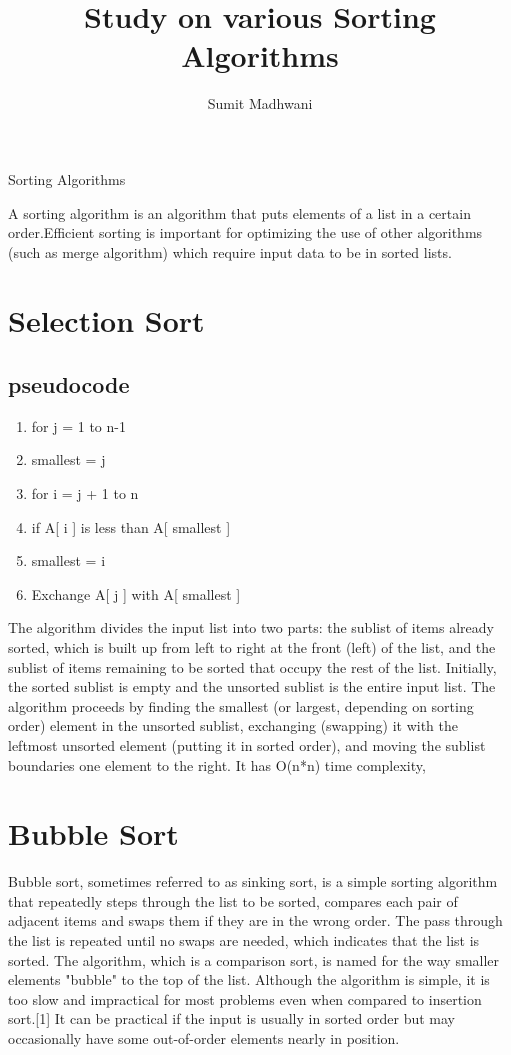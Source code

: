 \documentclass{IEEEtran}
\author{Sumit Madhwani}
\title{Study on various Sorting Algorithms}
\begin{document}
\maketitle


\begin{center}
Sorting Algorithms
\end{center}
A sorting algorithm is an algorithm that puts elements of a list in a certain order.Efficient sorting is important for optimizing the use of other algorithms (such as merge algorithm) which require input data to be in sorted lists.
\section{Selection Sort}
\subsection{pseudocode}
\begin{enumerate}
\item	    for j = 1 to n-1
\item	         smallest = j
\item		      	 for i = j + 1 to n
\item	                  if A[ i ] is less than A[ smallest ]
\item                          smallest = i
\item         	  Exchange A[ j ] with A[ smallest ]
\end{enumerate}

The algorithm divides the input list into two parts: the sublist of items already sorted, which is built up from left to right at the front (left) of the list, and the sublist of items remaining to be sorted that occupy the rest of the list. Initially, the sorted sublist is empty and the unsorted sublist is the entire input list. The algorithm proceeds by finding the smallest (or largest, depending on sorting order) element in the unsorted sublist, exchanging (swapping) it with the leftmost unsorted element (putting it in sorted order), and moving the sublist boundaries one element to the right.
 It has O(n*n) time complexity, 
\section{Bubble Sort}
Bubble sort, sometimes referred to as sinking sort, is a simple sorting algorithm that repeatedly steps through the list to be sorted, compares each pair of adjacent items and swaps them if they are in the wrong order. The pass through the list is repeated until no swaps are needed, which indicates that the list is sorted. The algorithm, which is a comparison sort, is named for the way smaller elements "bubble" to the top of the list. Although the algorithm is simple, it is too slow and impractical for most problems even when compared to insertion sort.[1] It can be practical if the input is usually in sorted order but may occasionally have some out-of-order elements nearly in position.
\end{document}
